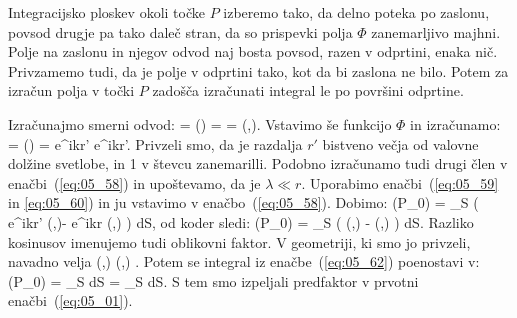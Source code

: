 Integracijsko ploskev okoli točke $P$ izberemo tako, da delno poteka po zaslonu, povsod drugje
pa tako daleč stran, da so prispevki polja $\Phi$ zanemarljivo majhni. Polje na zaslonu in njegov odvod
naj bosta povsod, razen v odprtini, enaka nič. Privzamemo tudi, da je polje
v odprtini tako, kot da bi zaslona ne bilo. Potem za izračun polja v točki $P$ zadošča izračunati
integral le po površini odprtine. 

Izračunajmo smerni odvod:
\beq
{} = (\nabla \Phi)\cdot {} = 
 \cdot {} =  
\cos\left(,\right).
\label{eq:05_59}
\eeq
Vstavimo še funkcijo $\Phi$ in izračunamo:
\beq
{} = \left(\right) = 
e^{ikr'} \approx {}e^{ikr'}.
\label{eq:05_60}
\eeq
Privzeli smo, da je razdalja $r'$ bistveno večja od valovne dolžine svetlobe, in 1 v števcu zanemarilli. 
Podobno izračunamo tudi drugi člen v enačbi~(\ref{eq:05_58}) in upoštevamo, da je $\lambda \ll r$. 
Uporabimo enačbi~(\ref{eq:05_59} in \ref{eq:05_60}) in ju vstavimo v enačbo~(\ref{eq:05_58}). Dobimo:
\beq
\Phi(P_0) =  \int_S \left(  e^{ikr'} \cos\left(,\right)-
 e^{ikr} \cos\left(,\right)  \right) dS,
\label{eq:05_61}
\eeq
od koder sledi:
\beq
\Phi(P_0) =  \int_S 
\left( \cos\left(,\right) - \cos\left(,\right) \right) dS.
\label{eq:05_62}
\eeq
Razliko kosinusov imenujemo tudi oblikovni faktor. V geometriji, ki smo jo privzeli, navadno velja
\beq
\cos\left(,\right)  \qquad {} \qquad \cos\left(,\right) .
\label{eq:05_63}
\eeq
Potem se integral iz enačbe~(\ref{eq:05_62}) poenostavi v:
\beq
\Phi(P_0) =  \int_S  dS =  \int_S  dS.
\label{eq:05_64}
\eeq
S tem smo izpeljali predfaktor v prvotni enačbi~(\ref{eq:05_01}).
